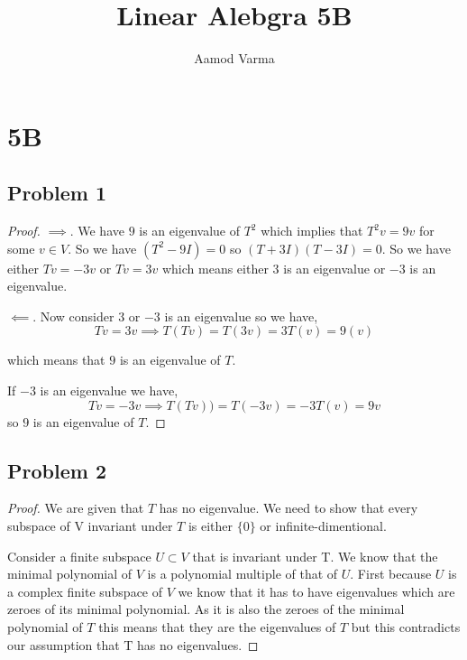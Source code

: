 \documentclass[a4paper]{report}
\title{Linear Alebgra 5B}
\author{Aamod Varma}
\begin{document}
\maketitle
\date{}

\section*{5B}
\subsection*{Problem 1}
\begin{proof}
   $\implies$. We have $9$ is an eigenvalue of $T^2$ which implies that $T^2v = 9v$ for some $v \in V$. So we have  $(T^2 - 9I) = 0$ so $(T + 3I)(T - 3I) = 0$. So we have either  $Tv = -3v$ or $Tv = 3v$ which means either $3$ is an eigenvalue or $-3$ is an eigenvalue.

   $\impliedby$. Now consider $3$ or $-3$ is an eigenvalue so we have, 
   $$ Tv = 3v \implies T(Tv) = T(3v) = 3T(v) = 9(v) $$  

   which means that $9$ is an eigenvalue of $T$.

   If $-3$ is an eigenvalue we have, 
   $$ Tv = -3v \implies T(Tv)) = T(-3v) = -3T(v) = 9v $$ 
   so $9$ is an eigenvalue of $T.$
\end{proof}


\subsection*{Problem 2}
\begin{proof}
   We are given that $T$ has no eigenvalue. We need to show that every subspace of V invariant under $T$  is either $\{0\}$  or infinite-dimentional.

   Consider a finite subspace $U \subset V$ that is invariant under T. We know that the minimal polynomial of $V$ is a polynomial multiple of that of $U$. First because $U$ is a complex finite subspace of $V$ we know that it has to have eigenvalues which are zeroes of its minimal polynomial. As it is also the zeroes of the minimal polynomial of $T$ this means that they are the eigenvalues of $T$ but this contradicts our assumption that T has no eigenvalues.
\end{proof}
\end{document}
